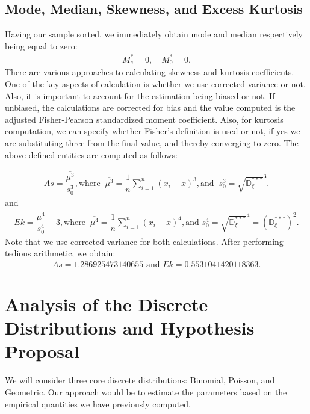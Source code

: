 \documentclass[final,3p,times,onecolumn]{elsarticle}
\begin{document}
\subsection{Mode, Median, Skewness, and Excess Kurtosis}
Having our sample sorted, we immediately obtain mode and median respectively being equal to zero:
\begin{gather*}
M_e^* = 0, \quad M_0^* = 0.
\end{gather*}
There are various approaches to calculating skewness and kurtosis coefficients.
One of the key aspects of calculation is whether we use corrected variance or not. 
Also, it is important to account for the estimation being biased or not. 
If unbiased, the calculations are corrected for bias and the value computed is 
the adjusted Fisher-Pearson standardized moment coefficient. %
Also, for kurtosis computation, we can specify whether Fisher's definition is used or not, if yes we are substituting three from the final value, and thereby converging to zero. 
The above-defined entities are computed as follows: 

\begin{gather*}
As = \dfrac{\overline{\mu^3}}{s_0^3}, \text{where } \ \overline{\mu^3} = \dfrac{1}{n}\sum\limits_{i = 1}^n(x_i - \overline{x})^3, \text{and } \ s_0^3 = \sqrt{\mathbb{D}_{\xi}^{***}}^3.
\end{gather*}
and 
\begin{gather*}
Ek = \dfrac{\overline{\mu^4}}{s_0^4} - 3, \text{where } \ \overline{\mu^4} = \dfrac{1}{n}\sum\limits_{i = 1}^n(x_i - \overline{x})^4, \text{and } s_0^4 = \sqrt{\mathbb{D}_{\xi}^{***}}^4 = (\mathbb{D}_{\xi}^{***})^2.
\end{gather*}
Note that we use corrected variance for both calculations. After performing tedious arithmetic, we obtain: 
\begin{gather*}
As = 1.286925473140655 \text{ and } Ek = 0.5531041420118363. 
\end{gather*}

\section{Analysis of the Discrete Distributions and Hypothesis Proposal}
We will consider three core discrete distributions: Binomial, Poisson, and Geometric. 
Our approach would be to estimate the parameters based on the empirical quantities 
we have previously computed.
\end{document}
